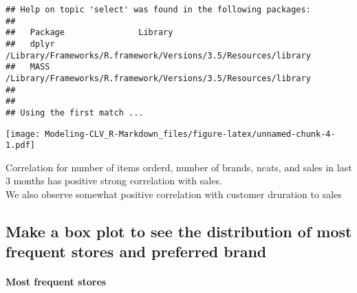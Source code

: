 \documentclass[
]{article}
\newenvironment{Shaded}{\begin{snugshade}}{\end{snugshade}}
\newcommand{\DataTypeTok}[1]{\textcolor[rgb]{0.13,0.29,0.53}{#1}}
\newcommand{\KeywordTok}[1]{\textcolor[rgb]{0.13,0.29,0.53}{\textbf{#1}}}
\newcommand{\NormalTok}[1]{#1}
\newcommand{\OperatorTok}[1]{\textcolor[rgb]{0.81,0.36,0.00}{\textbf{#1}}}
\newcommand{\StringTok}[1]{\textcolor[rgb]{0.31,0.60,0.02}{#1}}
\begin{document}
\begin{verbatim}
## Help on topic 'select' was found in the following packages:
## 
##   Package               Library
##   dplyr                 /Library/Frameworks/R.framework/Versions/3.5/Resources/library
##   MASS                  /Library/Frameworks/R.framework/Versions/3.5/Resources/library
## 
## 
## Using the first match ...
\end{verbatim}

\begin{Shaded}
\end{Shaded}

\texttt{[image: Modeling-CLV\_R-Markdown\_files/figure-latex/unnamed-chunk-4-1.pdf]}

Correlation for number of items orderd, number of brands, ncats, and
sales in last 3 months has positive strong correlation with sales.\\
We also observe somewhat positive correlation with customer druration to
sales

\hypertarget{make-a-box-plot-to-see-the-distribution-of-most-frequent-stores-and-preferred-brand}{%
\subsection{Make a box plot to see the distribution of most frequent
stores and preferred
brand}\label{make-a-box-plot-to-see-the-distribution-of-most-frequent-stores-and-preferred-brand}}

\hypertarget{most-frequent-stores}{%
\paragraph{Most frequent stores}\label{most-frequent-stores}}
\end{document}
